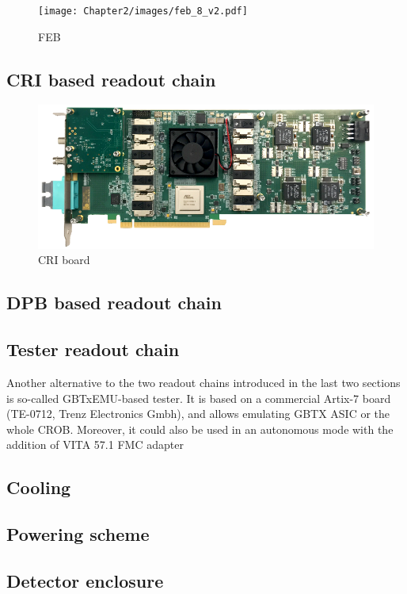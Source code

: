 \begin{figure}[!h]
\centering
\texttt{[image: Chapter2/images/feb\_8\_v2.pdf]}
\caption{FEB}
\label{fig_febA_photo}
\end{figure}
\subsection{CRI based readout chain}
\begin{figure}[!h]
\centering
\includegraphics[width=0.65\columnwidth]{Chapter2/images/cri_board_atlas.pdf}
\caption{CRI board}
\label{fig_cri_board}
\end{figure}
\subsection{DPB based readout chain}

\subsection{Tester readout chain}
\label{tester}
Another alternative to the two readout chains introduced in the last two sections is so-called GBTxEMU-based tester. It is based on a commercial Artix-7 board (TE-0712, Trenz Electronics Gmbh), and allows emulating GBTX ASIC or the whole CROB. Moreover, it could also be used in an autonomous mode with the addition of VITA  57.1 FMC adapter

\subsection{Cooling}
\label{cooling}
\subsection{Powering scheme}
\label{powering}
\subsection{Detector enclosure}
